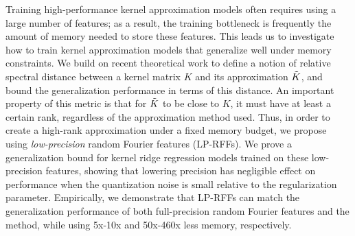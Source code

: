 
Training high-performance kernel approximation models often requires using a large number of features; as a result, the training bottleneck is frequently the amount of memory needed to store these features. This leads us to investigate how to train kernel approximation models that generalize well under memory constraints. We build on recent theoretical work to define a notion of relative spectral distance between a kernel matrix $K$ and its approximation $\tilde{K}$, and bound the generalization performance in terms of this distance. An important property of this metric is that for $\tilde{K}$ to be close to $K$, it must have at least a certain rank, regardless of the approximation method used. Thus, in order to create a high-rank approximation under a fixed memory budget, we propose using \emph{low-precision} random Fourier features (LP-RFFs). We prove a generalization bound for kernel ridge regression models trained on these low-precision features, showing that lowering precision has negligible effect on performance when the quantization noise is small relative to the regularization parameter. Empirically, we demonstrate that LP-RFFs can match the generalization performance of both full-precision random Fourier features and the \Nystrom method, while using 5x-10x and 50x-460x less memory, respectively.


